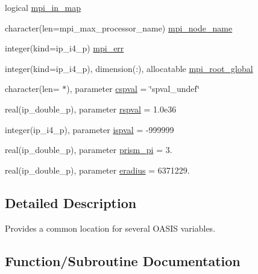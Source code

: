 \begin{DoxyCompactItemize}
\item 
logical \hyperlink{namespacemod__oasis__data_a799f6f0a442fcc2ab9960814b8b1b74a}{mpi\+\_\+in\+\_\+map}
\item 
character(len=mpi\+\_\+max\+\_\+processor\+\_\+name) \hyperlink{namespacemod__oasis__data_ad186b77d375be587e4f198ca45026d2e}{mpi\+\_\+node\+\_\+name}
\item 
integer(kind=ip\+\_\+i4\+\_\+p) \hyperlink{namespacemod__oasis__data_abd48a08a17f07ec656912d9b2b7b7922}{mpi\+\_\+err}
\item 
integer(kind=ip\+\_\+i4\+\_\+p), dimension(\+:), allocatable \hyperlink{namespacemod__oasis__data_a7f03d4afc0c91a42b13ddcf7ec082e51}{mpi\+\_\+root\+\_\+global}
\item 
character(len= $\ast$), parameter \hyperlink{namespacemod__oasis__data_acfb160b3d147e7cb667b0dc0f5bb2960}{cspval} = \char`\"{}spval\+\_\+undef\char`\"{}
\item 
real(ip\+\_\+double\+\_\+p), parameter \hyperlink{namespacemod__oasis__data_a3fea2837639caadabd693f405693edbb}{rspval} = 1.\+0e36
\item 
integer(ip\+\_\+i4\+\_\+p), parameter \hyperlink{namespacemod__oasis__data_a66bd35eca1454b6d8c8ac0449f2ca475}{ispval} = -\/999999
\item 
real(ip\+\_\+double\+\_\+p), parameter \hyperlink{namespacemod__oasis__data_ad5c84ea4b3063c2a3883b6d6571afeb0}{prism\+\_\+pi} = 3.
\item 
real(ip\+\_\+double\+\_\+p), parameter \hyperlink{namespacemod__oasis__data_a7f361db125e5554d0427e964b698f10c}{eradius} = 6371229.
\end{DoxyCompactItemize}


\subsection{Detailed Description}
Provides a common location for several O\+A\+S\+IS variables. 

\subsection{Function/\+Subroutine Documentation}
\mbox{\label{namespacemod__oasis__data_a7a3b7c8004b8d8869bbfa1fd4723da3e}} 
